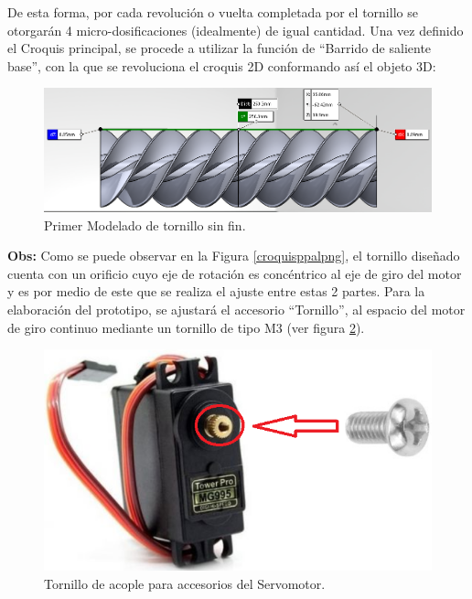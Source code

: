 \begin{enumerate}[(1)]
    De esta forma, por cada revolución o vuelta completada por el tornillo se otorgarán 4 micro-dosificaciones (idealmente) de igual cantidad.
    Una vez definido el Croquis principal, se procede a utilizar la función de ``Barrido de saliente base'', con la que se revoluciona el croquis 2D conformando así el objeto 3D:
    
    \begin{figure}[H]
	    \begin{center}
	    	\includegraphics[scale=0.55]{img/largotorni.png}
        \end{center}
	    \caption{Primer Modelado de tornillo sin fin. \label{largotornipng}}
    \end{figure}
    
    \textbf{Obs: } Como se puede observar en la Figura \ref{croquisppalpng}, el tornillo diseñado cuenta con un orificio cuyo eje de rotación es concéntrico al eje de giro del motor y es por medio de este que se realiza el ajuste entre estas 2 partes. Para la elaboración del prototipo, se ajustará el accesorio ``Tornillo'', al espacio del motor de giro continuo mediante un tornillo de tipo M3 (ver figura \ref{torniservopng}).
    
    \begin{figure}[H]
	    \begin{center}
	    	\includegraphics[scale=0.40]{img/torniservo.png}
        \end{center}
	    \caption{Tornillo de acople para accesorios del Servomotor. \label{torniservopng}}
    \end{figure}
    
    \end{enumerate}  %
    \pagebreak
